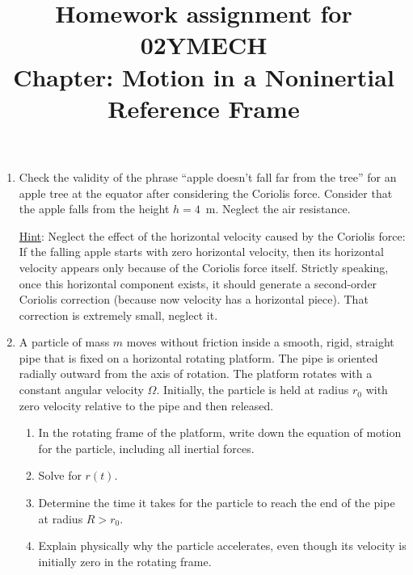 \documentclass[12pt]{article}
\title{Homework assignment for 02YMECH \\ Chapter: Motion in a Noninertial Reference Frame}
\begin{document}
\date{}
\maketitle
\vspace{-0.8in}


\begin{enumerate}
    \item Check the validity of the phrase ``apple doesn't fall far from the tree'' for an apple tree at the equator after considering the Coriolis force. Consider that the apple falls from the height $h = 4$~m. Neglect the air resistance.
    
    \underline{Hint}: Neglect the effect of the horizontal velocity caused by the Coriolis force: If the falling apple starts with zero horizontal velocity, then its horizontal velocity appears only because of the Coriolis force itself. Strictly speaking, once this horizontal component exists, it should generate a second-order Coriolis correction (because now velocity has a horizontal piece). That correction is extremely small, neglect it.
    
    \item A particle of mass $m$ moves without friction inside a smooth, rigid, straight pipe that is fixed on a horizontal rotating platform. The pipe is oriented radially outward from the axis of rotation. The platform rotates with a constant angular velocity $\Omega$. Initially, the particle is held at radius $r_0$ with zero velocity relative to the pipe and then released.

\begin{enumerate}
    \item In the rotating frame of the platform, write down the equation of motion for the particle, including all inertial forces.
    \item Solve for $r(t)$.
    \item Determine the time it takes for the particle to reach the end of the pipe at radius $R > r_0$.
    \item Explain physically why the particle accelerates, even though its velocity is initially zero in the rotating frame.
\end{enumerate}
    


\end{enumerate}
\end{document}
